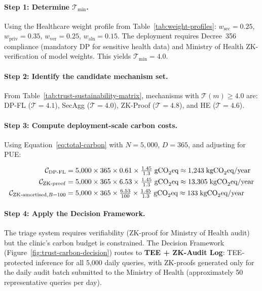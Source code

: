 \paragraph{Step 1: Determine $\mathcal{T}_{\min}$.}
Using the Healthcare weight profile from
Table~\ref{tab:weight-profiles}:
$w_{\mathrm{sec}} = 0.25$,
$w_{\mathrm{priv}} = 0.35$,
$w_{\mathrm{ver}} = 0.25$,
$w_{\mathrm{aln}} = 0.15$.
The deployment requires Decree~356 compliance (mandatory DP
for sensitive health data) and Ministry of Health ZK-verification
of model weights.
This yields $\mathcal{T}_{\min} = 4.0$.

\paragraph{Step 2: Identify the candidate mechanism set.}
From Table~\ref{tab:trust-sustainability-matrix}, mechanisms
with $\mathcal{T}(m) \geq 4.0$ are:
DP-FL ($\mathcal{T} = 4.1$),
SecAgg ($\mathcal{T} = 4.0$),
ZK-Proof ($\mathcal{T} = 4.8$),
and HE ($\mathcal{T} = 4.6$).

\paragraph{Step 3: Compute deployment-scale carbon costs.}
Using Equation~\eqref{eq:total-carbon} with
$N = 5{,}000$, $D = 365$, and adjusting for PUE:

\begin{align}
  \label{eq:worked-carbon}
  \mathcal{C}_{\mathrm{DP\text{-}FL}}
    &= 5{,}000 \times 365 \times 0.61
       \times \tfrac{1.45}{1.3} \;\text{gCO}_2\text{eq}
    \approx 1{,}243\;\text{kgCO}_2\text{eq/year} \notag \\
  \mathcal{C}_{\mathrm{ZK\text{-}proof}}
    &= 5{,}000 \times 365 \times 6.53
       \times \tfrac{1.45}{1.3} \;\text{gCO}_2\text{eq}
    \approx 13{,}305\;\text{kgCO}_2\text{eq/year} \notag \\
  \mathcal{C}_{\mathrm{ZK\text{-}amortised},B=100}
    &= 5{,}000 \times 365 \times \tfrac{6.53}{100}
       \times \tfrac{1.45}{1.3} \;\text{gCO}_2\text{eq}
    \approx 133\;\text{kgCO}_2\text{eq/year}
\end{align}

\paragraph{Step 4: Apply the Decision Framework.}
The triage system requires verifiability (ZK-proof for Ministry
of Health audit) but the clinic's carbon budget is constrained.
The Decision Framework (Figure~\ref{fig:trust-carbon-decision})
routes to \textbf{TEE + ZK-Audit Log}: TEE-protected inference
for all 5{,}000 daily queries, with ZK-proofs generated only
for the daily audit batch submitted to the Ministry of Health
(approximately 50 representative queries per day).

